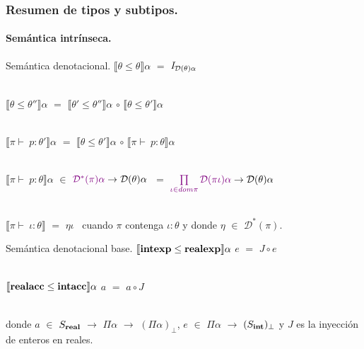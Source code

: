 \documentclass{beamer} %
\newcommand{\semBrcks}[1]{\llbracket #1 \rrbracket}
\newcommand{\D}{\mathcal{D}}
\newcommand{\intexp}{{\bf intexp}}
\newcommand{\realexp}{\bf{realexp}}
\newcommand{\intacc}{{\bf intacc}}
\newcommand{\realacc}{\bf{realacc}}
\newcommand{\setstate}{\Pi \alpha}
\begin{document}
\begin{frame}[shrink=1]
\frametitle{Resumen de tipos y subtipos.}
\framesubtitle{Sem\'antica intr\'inseca.}
\begin{block}{Sem\'antica denotacional.}\small
$\semBrcks{\theta \leq \theta} \alpha$ $=$ $\it{I}_{\D(\theta)\alpha}$\\
\

$\semBrcks{\theta \leq \theta''} \alpha$ $=$ $\semBrcks{\theta' \leq \theta''}\alpha$ $\circ$ $\semBrcks{\theta \leq \theta'}\alpha$\\
\

$\semBrcks{\pi \vdash \ p:\theta'} \alpha$ $=$ $\semBrcks{\theta \leq \theta'}\alpha$ $\circ$ $\semBrcks{\pi \vdash \ p:\theta} \alpha$\\
\

$\semBrcks{\pi \vdash \ p:\theta} \alpha$ $\in$ $\textcolor{violet}{\D^{*}(\pi)\alpha} \rightarrow \D(\theta)\alpha$ $\ =$ 
$\textcolor{violet}{\prod\limits_{\iota \in dom \pi} \D(\pi\iota)\alpha} \rightarrow \D(\theta)\alpha$\\
\

$\semBrcks{\pi \vdash \ \iota:\theta}$ $=$ $\eta\iota$ \ cuando $\pi$ contenga $\iota:\theta$ y donde $\eta$ $\in$ $\D^* (\pi)$.
\end{block}

\begin{block}{Sem\'antica denotacional base.}\small
$\semBrcks{\intexp \leq \realexp} \alpha$ $e$ $=$ $J \circ e$\\
\

$\semBrcks{\realacc \leq \intacc} \alpha$ $a$ $=$ $a \circ J$\\
\

donde $a$ $\in$ $S_{\bf{real}}$ $\rightarrow$ $\setstate$ $\rightarrow$ $(\setstate)_\bot$, 
$e$ $\in$ $\setstate$ $\rightarrow$ $(S_{\bf{int}})_\bot$ y $J$ es la inyecci\'on de enteros en reales.
\end{block}
\end{frame}
\end{document}
